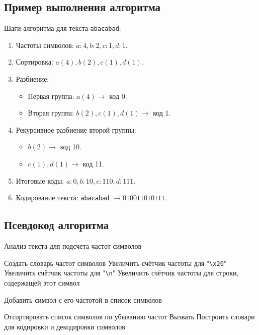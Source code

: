 \documentclass[12pt]{article}
\begin{document}
\subsection{Пример выполнения алгоритма}
Шаги алгоритма для текста \texttt{abacabad}:
\begin{enumerate}
    \item Частоты символов: $a: 4, b: 2, c: 1, d: 1$.
    \item Сортировка: $a (4), b (2), c (1), d (1)$.
    \item Разбиение: \begin{itemize}
        \item Первая группа: $a (4) \to$ код 0.
        \item Вторая группа: $b (2), c (1), d (1) \to$ код 1.
    \end{itemize}
    \item Рекурсивное разбиение второй группы:
        \begin{itemize}
            \item $b (2) \to$ код 10.
            \item $c (1), d (1) \to$ код 11.
        \end{itemize}
    \item Итоговые коды: $a: 0, b: 10, c: 110, d: 111$.
    \item Кодирование текста: \texttt{abacabad} $\to 010011010111$.
\end{enumerate}

\subsection{Псевдокод алгоритма}
\begin{algorithm}[H]
\caption{Анализ текста для подсчета частот символов}
\begin{algorithmic}[1]
    \State Создать словарь частот символов
            \State Увеличить счётчик частоты для "\texttt{\textbackslash x20}"
            \State Увеличить счётчик частоты для "\texttt{\textbackslash n}"
        \Else
            \State Увеличить счётчик частоты для строки, содержащей этот символ
        \EndIf
    \EndFor

        \State Добавить символ с его частотой в список символов
    \EndFor

    \State Отсортировать список символов по убыванию частот
    \State Вызвать 
    \State Построить словари для кодировки и декодировки символов
\EndFunction
\end{algorithmic}
\end{algorithm}
\end{document}
